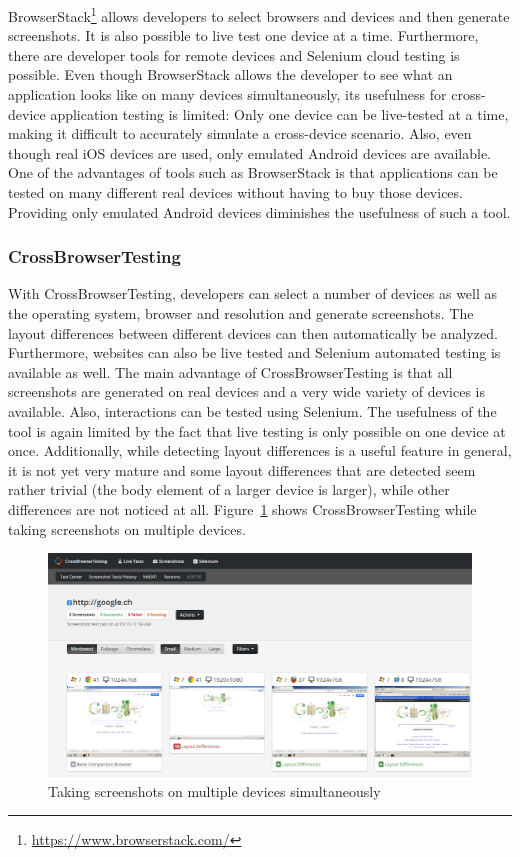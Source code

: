 BrowserStack\footnote{\url{https://www.browserstack.com/}} allows developers to select browsers and devices and then generate screenshots. It is also possible to live test one device at a time. Furthermore, there are developer tools for remote devices and Selenium cloud testing is possible. Even though BrowserStack allows the developer to see what an application looks like on many devices simultaneously, its usefulness for cross-device application testing is limited: Only one device can be live-tested at a time, making it difficult to accurately simulate a cross-device scenario. Also, even though real iOS devices are used, only emulated Android devices are available. One of the advantages of tools such as BrowserStack is that applications can be tested on many different real devices without having to buy those devices. Providing only emulated Android devices diminishes the usefulness of such a tool.

\subsubsection{CrossBrowserTesting}

With CrossBrowserTesting, developers can select a number of devices as well as the operating system, browser and resolution and generate screenshots. The layout differences between different devices can then automatically be analyzed. Furthermore, websites can also be live tested and Selenium automated testing is available as well. The main advantage of CrossBrowserTesting is that all screenshots are generated on real devices and a very wide variety of devices is available. Also, interactions can be tested using Selenium. The usefulness of the tool is again limited by the fact that live testing is only possible on one device at once. Additionally, while detecting layout differences is a useful feature in general, it is not yet very mature and some layout differences that are detected seem rather trivial (the body element of a larger device is larger), while other differences are not noticed at all. Figure~\ref{fig:crossbrowsertesting} shows CrossBrowserTesting while taking screenshots on multiple devices.

\begin{figure}[H]
  \centering
    \includegraphics[width=1.0\textwidth]{images/relatedwork/cross_browser_testing_2.png}
	\caption[Screenshot: CrossBrowserTesting]{Taking screenshots on multiple devices simultaneously}
	\label{fig:crossbrowsertesting}
\end{figure}

